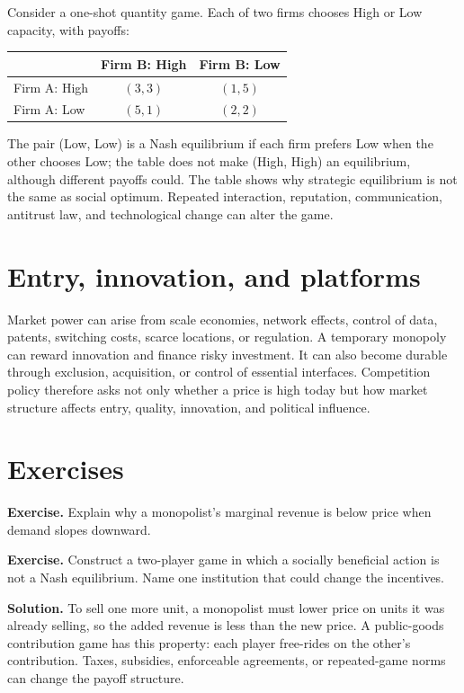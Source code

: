 \documentclass[11pt,oneside,openany]{book}
\newcommand{\exercise}[1]{\textbf{Exercise.} #1}
\newcommand{\solution}[1]{\textbf{Solution.} #1}
\begin{document}
Consider a one-shot quantity game. Each of two firms chooses High or Low capacity, with payoffs:

\begin{center}
\begin{tabular}{lcc}
\toprule
 & Firm B: High & Firm B: Low\\
\midrule
Firm A: High & $(3,3)$ & $(1,5)$\\
Firm A: Low & $(5,1)$ & $(2,2)$\\
\bottomrule
\end{tabular}
\end{center}

The pair (Low, Low) is a Nash equilibrium if each firm prefers Low when the other chooses Low; the table does not make (High, High) an equilibrium, although different payoffs could. The table shows why strategic equilibrium is not the same as social optimum. Repeated interaction, reputation, communication, antitrust law, and technological change can alter the game.

\section{Entry, innovation, and platforms}

Market power can arise from scale economies, network effects, control of data, patents, switching costs, scarce locations, or regulation. A temporary monopoly can reward innovation and finance risky investment. It can also become durable through exclusion, acquisition, or control of essential interfaces. Competition policy therefore asks not only whether a price is high today but how market structure affects entry, quality, innovation, and political influence.

\section{Exercises}

\exercise{Explain why a monopolist's marginal revenue is below price when demand slopes downward.}

\exercise{Construct a two-player game in which a socially beneficial action is not a Nash equilibrium. Name one institution that could change the incentives.}

\solution{To sell one more unit, a monopolist must lower price on units it was already selling, so the added revenue is less than the new price. A public-goods contribution game has this property: each player free-rides on the other's contribution. Taxes, subsidies, enforceable agreements, or repeated-game norms can change the payoff structure.}
\end{document}

